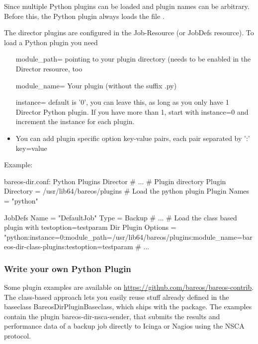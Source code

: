 Since  multiple Python plugins can be loaded and plugin names can be arbitrary. Before this, the Python plugin always loads the file .

The director plugins are configured in the Job-Resource (or JobDefs resource). To load a Python plugin you need
\begin{itemize}
 \item [module\_path= ] pointing to your plugin directory (needs to be enabled in the Director resource, too
 \item [module\_name= ] Your plugin (without the suffix .py)
 \item [instance= ] default is '0', you can leave this, as long as you only have 1 Director Python plugin. If you have more than 1, start with instance=0 and increment the instance for each plugin.
 \item You can add plugin specific option key-value pairs, each pair separated by ':' key=value
\end{itemize}


Example:

\begin{bconfig}{bareos-dir.conf: Python Plugins}
Director {
  # ...
  # Plugin directory
  Plugin Directory = /usr/lib64/bareos/plugins
  # Load the python plugin
  Plugin Names = "python"
}

JobDefs {
  Name = "DefaultJob"
  Type = Backup
  # ...
  # Load the class based plugin with testoption=testparam
  Dir Plugin Options = "python:instance=0:module_path=/usr/lib64/bareos/plugins:module_name=bareos-dir-class-plugins:testoption=testparam
  # ...
}
\end{bconfig}

\subsubsection{Write your own Python Plugin}

Some plugin examples are available on \url{https://github.com/bareos/bareos-contrib}. 
The class-based approach lets you easily reuse stuff already
defined in the baseclass BareosDirPluginBaseclass, which ships with the  package.
The examples contain the plugin bareos-dir-nsca-sender, that submits the results and performance data of a backup job directly to Icinga or Nagios using the NSCA protocol.
